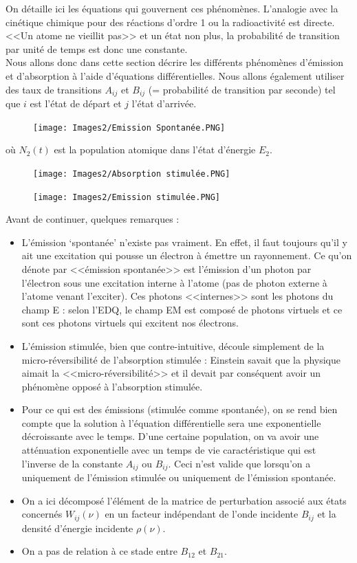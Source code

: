 On détaille ici les équations qui gouvernent ces phénomènes. L'analogie avec la cinétique chimique pour des réactions d'ordre 1 ou la radioactivité est directe. <<Un atome ne vieillit pas>> et un état non plus, la probabilité de transition par unité de temps est donc une constante.\\
Nous allons donc dans cette section décrire les différents phénomènes d'émission et d'absorption à l'aide d'équations différentielles. Nous allons également utiliser des taux de transitions $A_{ij}$ et $B_{ij}$ (= probabilité de transition par seconde) tel que $i$ est l'état de départ et $j$ l'état d'arrivée.
\begin{figure}[tph]
    \centering
    \texttt{[image: Images2/Emission Spontanée.PNG]}
    \label{fig:emission_spont}
\end{figure}
où $N_2(t)$ est la population atomique dans l'état d'énergie $E_2$.
\begin{figure}[tph]
    \texttt{[image: Images2/Absorption stimulée.PNG]}
    \label{fig:absorb_stimul}
\end{figure}
\begin{figure}[tph]
    \texttt{[image: Images2/Emission stimulée.PNG]}
    \label{fig:emission_stimul}
\end{figure}
Avant de continuer, quelques remarques :
\begin{itemize}[label=$\bullet$]
    \item L'émission `spontanée' n'existe pas vraiment. En effet, il faut toujours qu'il y ait une excitation qui pousse un électron à émettre un rayonnement. Ce qu'on dénote par <<émission spontanée>> est l'émission d'un photon par l'électron sous une excitation interne à l'atome (pas de photon externe à l'atome venant l'exciter). Ces photons <<internes>> sont les photons du champ E : selon l'EDQ, le champ EM est composé de photons virtuels et ce sont ces photons virtuels qui excitent nos électrons.
    \item L'émission stimulée, bien que contre-intuitive, découle simplement de la micro-réversibilité de l'absorption stimulée : Einstein savait que la physique aimait la <<micro-réversibilité>> et il devait par conséquent avoir un phénomène opposé à l'absorption stimulée.
    \item Pour ce qui est des émissions (stimulée comme spontanée), on se rend bien compte que la solution à l'équation différentielle sera une exponentielle décroissante avec le temps. D'une certaine population, on va avoir une atténuation exponentielle avec un temps de vie caractéristique qui est l'inverse de la constante $A_{ij}$ ou $B_{ij}$. Ceci n'est valide que lorsqu'on a uniquement de l'émission stimulée ou uniquement de l'émission spontanée.
    \item On a ici décomposé l'élément de la matrice de perturbation associé aux états concernés $W_{ij}(\nu)$ en un facteur indépendant de l'onde incidente $B_{ij}$ et la densité d'énergie incidente $\rho(\nu)$.
    \item On a pas de relation à ce stade entre $B_{12}$ et $B_{21}$.
\end{itemize}
